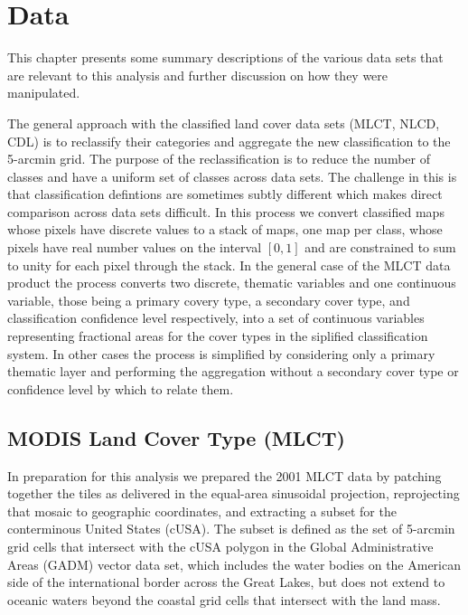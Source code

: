 







\graphicspath{ {data/} }


\chapter{Data}
\label{cha:data}

This chapter presents some summary descriptions of the various data
sets that are relevant to this analysis and further discussion on how
they were manipulated.

The general approach with the classified land cover data sets (MLCT,
NLCD, CDL) is to reclassify their categories and aggregate the new
classification to the 5-arcmin grid.  The purpose of the
reclassification is to reduce the number of classes and have a uniform
set of classes across data sets.  The challenge in this is that
classification defintions are sometimes subtly different which makes
direct comparison across data sets difficult.  In this process we
convert classified maps whose pixels have discrete values to a stack
of maps, one map per class, whose pixels have real number values on
the interval $[0,1]$ and are constrained to sum to unity for each
pixel through the stack.  In the general case of the MLCT data product
the process converts two discrete, thematic variables and one
continuous variable, those being a primary covery type, a secondary
cover type, and classification confidence level respectively, into a
set of continuous variables representing fractional areas for the
cover types in the siplified classification system.  In other cases
the process is simplified by considering only a primary thematic layer
and performing the aggregation without a secondary cover type or
confidence level by which to relate them.


\section{MODIS Land Cover Type (MLCT)}
\label{sec:mlct}

In preparation for this analysis we prepared the 2001 MLCT data by patching
together the tiles as delivered in the equal-area sinusoidal
projection, reprojecting that mosaic to geographic coordinates, and
extracting a subset for the conterminous United States (cUSA).  The
subset is defined as the set of 5-arcmin grid cells that intersect
with the cUSA polygon in the Global Administrative Areas (GADM) vector
data set, which includes the water bodies on the American side of the
international border across the Great Lakes, but does not extend to
oceanic waters beyond the coastal grid cells that intersect with the
land mass.  

